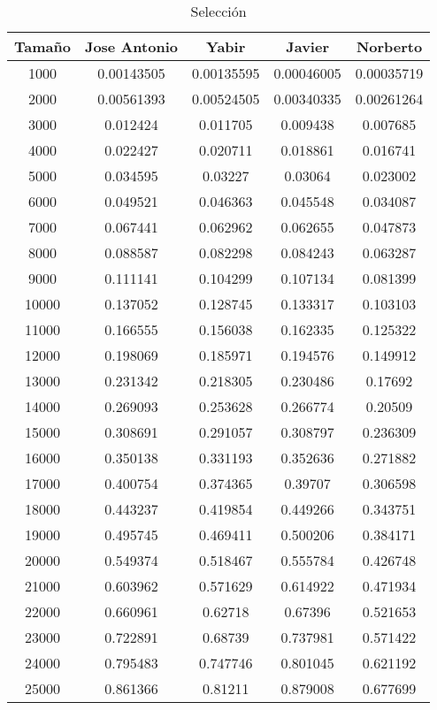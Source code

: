 \documentclass{article}
\begin{document}
\newpage

\begin{table}[h]
	\centering
	\caption{Selección}
\begin{tabular}{ | c | c  | c | c | c | }
  \hline
   Tama\~no & Jose Antonio & Yabir & Javier & Norberto\\ 
   \hline
1000	&	0.00143505	&	0.00135595	&	0.00046005	&	0.00035719	\\
2000	&	0.00561393	&	0.00524505	&	0.00340335	&	0.00261264	\\
3000	&	0.012424	&	0.011705	&	0.009438	&	0.007685	\\
4000	&	0.022427	&	0.020711	&	0.018861	&	0.016741	\\
5000	&	0.034595	&	0.03227	&	0.03064	&	0.023002	\\
6000	&	0.049521	&	0.046363	&	0.045548	&	0.034087	\\
7000	&	0.067441	&	0.062962	&	0.062655	&	0.047873	\\
8000	&	0.088587	&	0.082298	&	0.084243	&	0.063287	\\
9000	&	0.111141	&	0.104299	&	0.107134	&	0.081399	\\
10000	&	0.137052	&	0.128745	&	0.133317	&	0.103103	\\
11000	&	0.166555	&	0.156038	&	0.162335	&	0.125322	\\
12000	&	0.198069	&	0.185971	&	0.194576	&	0.149912	\\
13000	&	0.231342	&	0.218305	&	0.230486	&	0.17692	\\
14000	&	0.269093	&	0.253628	&	0.266774	&	0.20509	\\
15000	&	0.308691	&	0.291057	&	0.308797	&	0.236309	\\
16000	&	0.350138	&	0.331193	&	0.352636	&	0.271882	\\
17000	&	0.400754	&	0.374365	&	0.39707	&	0.306598	\\
18000	&	0.443237	&	0.419854	&	0.449266	&	0.343751	\\
19000	&	0.495745	&	0.469411	&	0.500206	&	0.384171	\\
20000	&	0.549374	&	0.518467	&	0.555784	&	0.426748	\\
21000	&	0.603962	&	0.571629	&	0.614922	&	0.471934	\\
22000	&	0.660961	&	0.62718	&	0.67396	&	0.521653	\\
23000	&	0.722891	&	0.68739	&	0.737981	&	0.571422	\\
24000	&	0.795483	&	0.747746	&	0.801045	&	0.621192	\\
25000	&	0.861366	&	0.81211	&	0.879008	&	0.677699	\\
\hline
\end{tabular}
\end{table}
\end{document}
